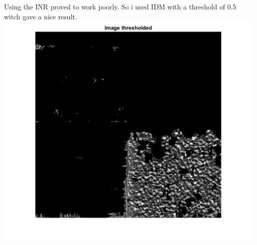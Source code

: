 \documentclass[12pt, letterpaper, twoside]{article}
\begin{document}
\ \\
\newpage
\ \\
Using the INR proved to work poorly. So i used IDM with a threshold of 0.5 witch gave a nice result.\\
\includegraphics[scale=0.7]{"2sub8seg.png"}\\
\end{document}
